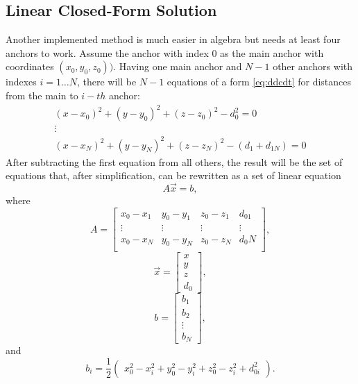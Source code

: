 \documentclass[journal]{IEEEtran}
\begin{document}
\subsection{Linear Closed-Form Solution}
Another implemented method is much easier in algebra but needs at least four anchors to work.
Assume the anchor with index $0$ as the main anchor with coordinates $(x_0, y_0, z_0))$.
Having one main anchor and $N-1$ other anchors with indexes $i=1 \ldots N$, there will be $N-1$ equations of a form \autoref{eq:ddcdt} for distances from the main to $i-th$ anchor:
\begin{equation}
    \begin{array}{cc}
        (x-x_0)^2 + (y-y_0)^2 + (z-z_0)^2 - d_0^2 = 0\\
        \vdots \\
        (x-x_N)^2 + (y-y_N)^2 + (z-z_N)^2 - (d_1 + d_{1N}) = 0 
    \end{array}
\end{equation}
After subtracting the first equation from all others, the result will be the set of equations that, after simplification, can be rewritten as a set of linear equation
\begin{equation}
    A\vec{x} = b,
\end{equation}
where
\begin{equation}
    A = \left[ \begin{array}{cccc}
         x_0 - x_1 & y_0 - y_1 & z_0 - z_1 & d_01  \\
         \vdots & \vdots & \vdots & \vdots \\
         x_0 - x_N & y_0 - y_N & z_0 - z_N & d_0N  \\
    \end{array} \right],
\end{equation}
\begin{equation}
    \vec{x} = \left[ \begin{array}{c}
         x \\ y \\ z \\ d_0
    \end{array} \right],
\end{equation}
\begin{equation}
    b = \left[ \begin{array}{c}
         b_1 \\ b_2 \\ \vdots \\ b_N
    \end{array} \right],
\end{equation}
and 
\begin{equation}
    b_i = \frac{1}{2} \left( \begin{array}{c}
         x_0^2 - x_i^2 + y_0^2 - y_i^2 + z_0^2 - z_i^2 + d_{0i}^2
    \end{array} \right).
\end{equation}
\end{document}
